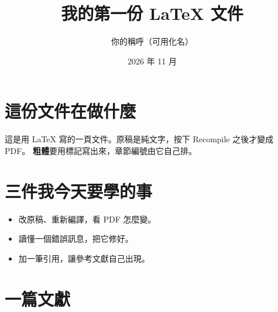 \documentclass[12pt,a4paper]{article}
\title{我的第一份 LaTeX 文件}
\author{你的稱呼（可用化名）}
\date{2026 年 11 月}
\begin{document}
\maketitle

\section{這份文件在做什麼}
這是用 LaTeX 寫的一頁文件。原稿是純文字，按下 Recompile 之後才變成 PDF。
\textbf{粗體}要用標記寫出來，章節編號由它自己排。

\section{三件我今天要學的事}
\begin{itemize}
  \item 改原稿、重新編譯，看 PDF 怎麼變。
  \item 讀懂一個錯誤訊息，把它修好。
  \item 加一筆引用，讓參考文獻自己出現。
\end{itemize}

\section{一篇文獻}

% 
% 
\end{document}
